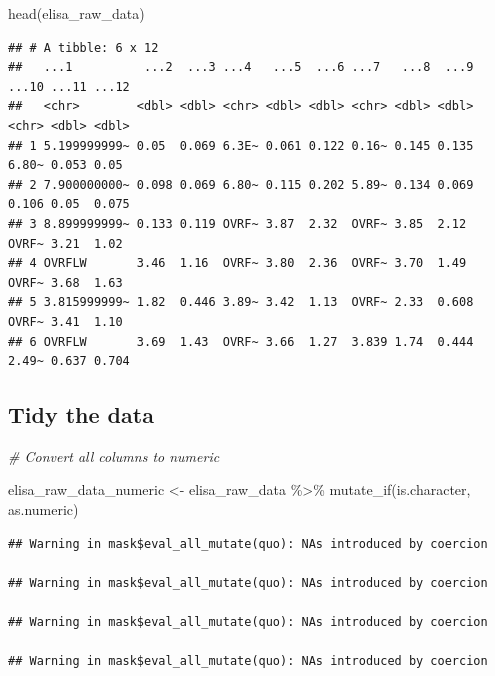 \documentclass[
]{book}
\newenvironment{Shaded}{\begin{snugshade}}{\end{snugshade}}
\newcommand{\CommentTok}[1]{\textcolor[rgb]{0.56,0.35,0.01}{\textit{#1}}}
\newcommand{\FunctionTok}[1]{\textcolor[rgb]{0.00,0.00,0.00}{#1}}
\newcommand{\NormalTok}[1]{#1}
\newcommand{\OtherTok}[1]{\textcolor[rgb]{0.56,0.35,0.01}{#1}}
\newcommand{\SpecialCharTok}[1]{\textcolor[rgb]{0.00,0.00,0.00}{#1}}
\begin{document}
\begin{Shaded}
\begin{Highlighting}[]
\FunctionTok{head}\NormalTok{(elisa\_raw\_data)}
\end{Highlighting}
\end{Shaded}

\begin{verbatim}
## # A tibble: 6 x 12
##   ...1          ...2  ...3 ...4   ...5  ...6 ...7   ...8  ...9 ...10 ...11 ...12
##   <chr>        <dbl> <dbl> <chr> <dbl> <dbl> <chr> <dbl> <dbl> <chr> <dbl> <dbl>
## 1 5.199999999~ 0.05  0.069 6.3E~ 0.061 0.122 0.16~ 0.145 0.135 6.80~ 0.053 0.05 
## 2 7.900000000~ 0.098 0.069 6.80~ 0.115 0.202 5.89~ 0.134 0.069 0.106 0.05  0.075
## 3 8.899999999~ 0.133 0.119 OVRF~ 3.87  2.32  OVRF~ 3.85  2.12  OVRF~ 3.21  1.02 
## 4 OVRFLW       3.46  1.16  OVRF~ 3.80  2.36  OVRF~ 3.70  1.49  OVRF~ 3.68  1.63 
## 5 3.815999999~ 1.82  0.446 3.89~ 3.42  1.13  OVRF~ 2.33  0.608 OVRF~ 3.41  1.10 
## 6 OVRFLW       3.69  1.43  OVRF~ 3.66  1.27  3.839 1.74  0.444 2.49~ 0.637 0.704
\end{verbatim}

\hypertarget{tidy-the-data}{%
\subsection{Tidy the data}\label{tidy-the-data}}

\begin{Shaded}
\begin{Highlighting}[]
\CommentTok{\# Convert all columns to numeric}

\NormalTok{elisa\_raw\_data\_numeric }\OtherTok{\textless{}{-}}\NormalTok{ elisa\_raw\_data }\SpecialCharTok{\%\textgreater{}\%} 
  \FunctionTok{mutate\_if}\NormalTok{(is.character, as.numeric)}
\end{Highlighting}
\end{Shaded}

\begin{verbatim}
## Warning in mask$eval_all_mutate(quo): NAs introduced by coercion

## Warning in mask$eval_all_mutate(quo): NAs introduced by coercion

## Warning in mask$eval_all_mutate(quo): NAs introduced by coercion

## Warning in mask$eval_all_mutate(quo): NAs introduced by coercion
\end{verbatim}
\end{document}
